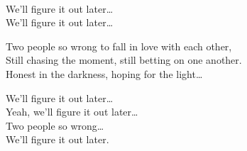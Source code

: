 \begin{lyrics}
\\
We’ll figure it out later…\\
We’ll figure it out later…

Two people so wrong to fall in love with each other,\\
Still chasing the moment, still betting on one another.\\
Honest in the darkness, hoping for the light…

We’ll figure it out later…\\
Yeah, we’ll figure it out later…\\
Two people so wrong…\\
We’ll figure it out later.
\end{lyrics}

